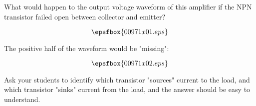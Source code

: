 

What would happen to the output voltage waveform of this amplifier if the NPN transistor failed open between collector and emitter?

$$\epsfbox{00971x01.eps}$$







The positive half of the waveform would be "missing":

$$\epsfbox{00971x02.eps}$$







Ask your students to identify which transistor "sources" current to the load, and which transistor "sinks" current from the load, and the answer should be easy to understand.



